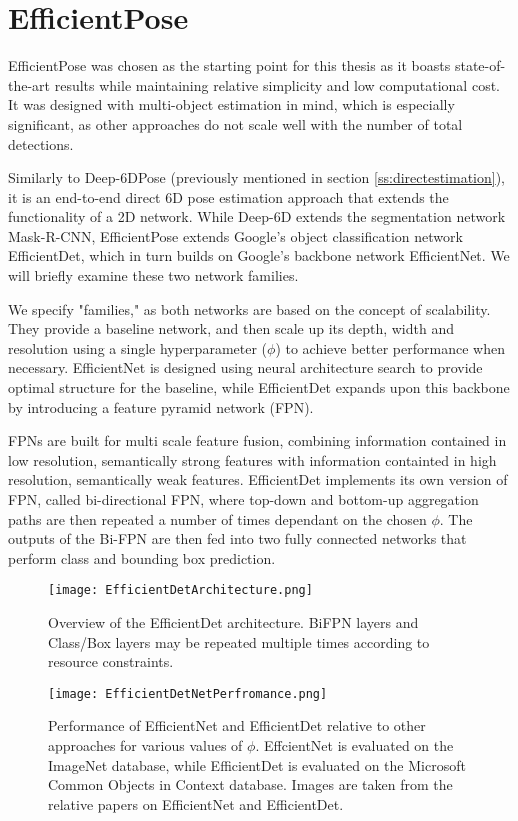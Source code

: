 \section{EfficientPose}

EfficientPose was chosen as the starting point for this thesis as it boasts state-of-the-art results while maintaining relative simplicity and low computational cost. It was designed with multi-object estimation in mind, which is especially significant, as other approaches do not scale well with the number of total detections.

Similarly to Deep-6DPose (previously mentioned in section \ref*{ss:directestimation}), it is an end-to-end direct 6D pose estimation approach that extends the functionality of a 2D network. While Deep-6D extends the segmentation network Mask-R-CNN, EfficientPose extends Google's object classification network EfficientDet\cite{EfficientDet}, which in turn builds on Google's backbone network EfficientNet\cite{EfficientNet}. We will briefly examine these two network families.

We specify "families," as both networks are based on the concept of scalability. They provide a baseline network, and then scale up its depth, width and resolution using a single hyperparameter ($\phi$) to achieve better performance when necessary. EfficientNet is designed using neural architecture search\cite{NAS} to provide optimal structure for the baseline, while EfficientDet expands upon this backbone by introducing a feature pyramid network\cite{FPN} (FPN).

FPNs are built for multi scale feature fusion, combining information contained in low resolution, semantically strong features with information containted in high resolution, semantically weak features. EfficientDet implements its own version of FPN, called bi-directional FPN, where top-down and bottom-up aggregation paths are then repeated a number of times dependant on the chosen $\phi$. The outputs of the Bi-FPN are then fed into two fully connected networks that perform class and bounding box prediction.

\begin{figure}[h]
    \centering
    \texttt{[image: EfficientDetArchitecture.png]}
    \caption{Overview of the EfficientDet architecture. BiFPN layers and Class/Box layers may be repeated multiple times according to resource constraints.}
\end{figure}

\begin{figure}[ht]
    \centering
    \texttt{[image: EfficientDetNetPerfromance.png]}
    \caption{Performance of EfficientNet and EfficientDet relative to other approaches for various values of $\phi$. EffcientNet is evaluated on the ImageNet database\cite{imagenet}, while EfficientDet is evaluated on the Microsoft Common Objects in Context database\cite{cocodataset}. Images are taken from the relative papers on EfficientNet and EfficientDet.}
\end{figure}

